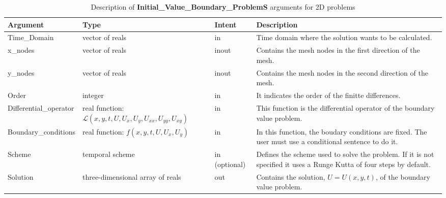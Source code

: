 \begin{table}[H]
	\begin{center}
		\begin{spacing}{1.2}
			\begin{tabular}{| l | p{5cm}| l | p{4cm} |}
				
				\hline
				
				\bf Argument & \bf Type & \bf Intent & \bf Description \\ \hline \hline
				
				Time\_Domain & vector of reals & in &  Time domain where the solution wants to be calculated.  \\ \hline
				
				x\_nodes & vector of reals & inout &  Contains the mesh nodes in the first direction of the mesh.  \\ \hline
				
				y\_nodes & vector of reals & inout &  Contains the mesh nodes in the second direction of the mesh.  \\ \hline
				
				Order &  integer  & in & It indicates the order of the finitte differences.  \\ \hline
				
				Differential\_operator & \raggedright real function: $\mathscr{L}\left(x, y, t, U,  U_x,  U_y,  U_{xx},  U_{yy},  U_{xy} \right)$ & in  & This function is the differential operator of the boundary value problem.   \\ \hline
				
				Boundary\_conditions & \raggedright real function: $f\left(x, y, t, U,  U_x,  U_y \right)$  & in &  In this function, the boudary conditions are fixed. The user must use a conditional sentence to do it.  \\ \hline
				
				Scheme & temporal scheme  & in (optional) & Defines the scheme used to solve the problem. If it is not specified it uses a Runge Kutta of four steps by default.    \\ \hline
				
				Solution & three-dimensional array of reals  & out &  Contains the solution, $U = U(x, y, t)$, of the boundary value problem. \\ \hline
				
				
			\end{tabular}
		\end{spacing}
	\end{center}
	\caption{Description of \textbf{Initial\_Value\_Boundary\_ProblemS} arguments for 2D problems}
\end{table}



